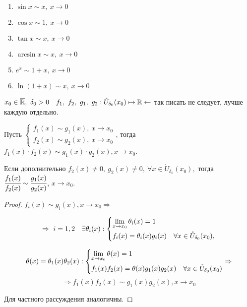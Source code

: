 \begin{examples} $\ $
\begin{enumerate}
    \item $\sin x \sim x, \ x\to 0$
    \item $\cos x \sim 1,\ x\to 0$
    \item $\tan x \sim x,\ x \to 0$
    \item $\arcsin x \sim x,\ x \to 0$
    \item $e^{x} \sim 1+x,\ x\to 0$
    \item $\ln(1+x) \sim x,\ x\to 0$
\end{enumerate}
\end{examples}
    


\begin{lemma}
    $x_{0} \in \overline{\mathbb{R}}, \ \delta_{0} > 0 \quad f_{1},\ f_{2},\ g_{1},\ g_{2}: \mathring{U}_{\delta_{0}}(x_{0}) \mapsto \mathbb{R} \leftarrow$ так писать не следует, лучше каждую отдельно.

    Пусть $\left\{
    \begin{gathered}
        f_{1}(x) \sim g_{1}(x),\  x\to x_{0} \\
        f_{2}(x) \sim g_{2}(x),\  x\to x_{0}
    \end{gathered} \right.$, тогда $f_{1}(x) \cdot f_{2} (x) \sim g_{1}(x) \cdot g_{2} (x), x\to x_{0}$.

    Если дополнительно $f_{2}(x) \neq 0,\  g_{2}(x) \neq 0, \ \forall x\in \mathring{U}_{\delta_{0}}(x_{0}),$ тогда $\cfrac{f_{1}(x)}{f_{2}(x)} \sim \cfrac{g_{1}(x)}{g_{2}(x)}$, $x\to x_{0}$.
\end{lemma}
\begin{proof}
    $f_{i}(x) \sim g_{i}(x), x\to x_{0} \Rightarrow $
    
    $$
    \Rightarrow \ i =1,2\quad  \exists \theta_{i}(x): \left\{
    \begin{gathered}
        \lim\limits_{x\to x_{0}} \theta_{i}(x) = 1 \hfill \\
        f_{i}(x) = \theta_{i}(x) g_{i}(x) \quad \forall x\in \mathring{U}_{\delta_{0}}(x_{0}), 
    \end{gathered} \right.$$

    $$
    \theta(x) = \theta_{1}(x)\theta_{2}(x): 
    \left\{ \begin{gathered}
        \lim\limits_{x \to x_{0}} \theta(x)= 1 \hfill \\
        f_{1}(x)f_{2}(x) = \theta(x) g_{1}(x)g_{2}(x) \quad \forall x\in \mathring{U}_{\delta_{0}}(x_{0})\hfill
        \end{gathered} \right.
        \Rightarrow
    $$
    $$
    \Rightarrow
        f_{1}(x)f_{2}(x)\sim g_{1}(x)g_{2}(x), x\to x_{0}
    $$

    Для частного рассуждения аналогичны.
\end{proof}

